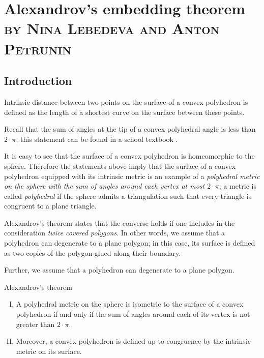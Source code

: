 \chapter[Alexandrov's embedding theorem]{Alexandrov's embedding theorem\\
\textsc{\normalsize by Nina Lebedeva and Anton Petrunin}}\label{chap:embedding}

\section{Introduction}

Intrinsic distance between two points on the surface of a convex polyhedron is defined as the length of a shortest curve on the surface between these points.

Recall that the sum of angles at the tip of a convex polyhedral angle is less than $2\cdot\pi$;
this statement can be found in a school textbook \cite[§~48]{kiselev-stereo-en}.

It is easy to see that the surface of a convex polyhedron is homeomorphic to the sphere.
Therefore the statements above imply that the surface of a convex polyhedron equipped with its intrinsic metric is an example of a \emph{polyhedral metric on the sphere with the sum of angles around each vertex at most $2\cdot\pi$};
a metric is called \emph{polyhedral} if the sphere admits a triangulation such that every triangle is congruent to a plane triangle.

Alexandrov's theorem states that the converse holds if one includes in the consideration \emph{twice covered polygons}.
In other words, we assume that a polyhedron can degenerate to a plane polygon;
in this case, its surface is defined as two copies of the polygon glued along their boundary.

Further, we assume that a polyhedron can degenerate to a plane polygon.

\pagebreak

\begin{thm}{Alexandrov's theorem}
\begin{enumerate}[I.]
\item\label{thm:exist}
A polyhedral metric on the sphere is isometric to the surface of a convex polyhedron if and only if the sum of angles around each of its vertex is not greater than $2\cdot\pi$.

\item\label{thm:unique} 
Moreover, a convex polyhedron is defined up to congruence by the intrinsic metric on its surface.
\end{enumerate}

\end{thm}


